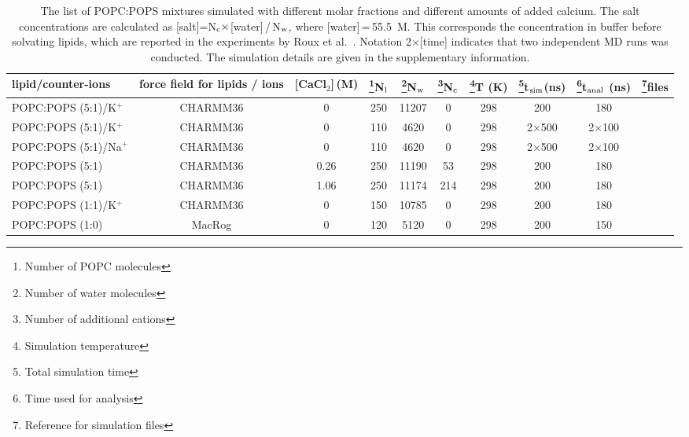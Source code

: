 \documentclass[aps,prl,superscriptaddress,twocolumn]{revtex4}
\begin{document}
\begin{table}[tb]
\centering
\caption{The list of POPC:POPS mixtures simulated with different molar fractions and different amounts of added calcium. 
  The salt concentrations are calculated as [salt]=N$_{\rm c} \times$[water]\,/\,N$_{\rm w}$, where [water]\,=\,55.5~M.
  This corresponds the concentration in buffer before solvating lipids, which are
  reported in the experiments by Roux et al.~\cite{roux90}.  Notation 2$\times$[time] indicates that two independent MD runs was conducted.
  The simulation details are given in the supplementary information. 
}\label{mixedIONsystems}
\begin{tabular}{lccccccccc}
lipid/counter-ions  & force field for lipids / ions  & {[}CaCl$_{2}${]}\,(M)  & \footnote{Number of POPC molecules}N$_{{\rm l}}$  & \footnote{Number of water molecules}N$_{{\rm w}}$  & \footnote{Number of additional cations}N$_{{\rm c}}$  & \footnote{Simulation temperature}T (K)  & \footnote{Total simulation time}t$_{{\rm sim}}$(ns)  & \footnote{Time used for analysis}t$_{{\rm anal}}$ (ns)  & \footnote{Reference for simulation files}files\tabularnewline
\hline 
POPC:POPS (5:1)/K$^{+}$  & CHARMM36 \cite{klauda10,venable13}  & 0  & 250  & 11207  & 0  & 298  & 200  & 180  & \cite{POPC5POPS1noCaClCHARMM} \tabularnewline
POPC:POPS (5:1)/K$^{+}$  & CHARMM36 \cite{klauda10,venable13}  & 0  & 110  & 4620  & 0  & 298  & 2$\times$500  & 2$\times$100  & \cite{charmm36pops+83popcT298Kpiggot} \tabularnewline
POPC:POPS (5:1)/Na$^{+}$  & CHARMM36 \cite{klauda10,venable13}  & 0  & 110 & 4620  & 0  & 298  & 2$\times$500  & 2$\times$100  & \cite{charmm36pops+83popcT298KpiggotSODIUM} \tabularnewline
POPC:POPS (5:1)  & CHARMM36 \cite{klauda10,venable13,kim16}  & 0.26  & 250 & 11190  & 53  & 298  & 200  & 180  & \cite{POPC5POPS1withCaClCHARMM} \tabularnewline
POPC:POPS (5:1)  & CHARMM36 \cite{klauda10,venable13,kim16}  & 1.06  & 250 & 11174  & 214  & 298  & 200  & 180  & \cite{POPC5POPS1with1MCaClCHARMM} \tabularnewline
POPC:POPS (1:1)/K$^{+}$  & CHARMM36 \cite{klauda10,venable13}  & 0  & 150  & 10785  & 0  & 298  & 200  & 180  & \cite{POPC1POPS1noCaClCHARMM} \tabularnewline
\hline 
POPC:POPS (1:0)  & MacRog \cite{maciejewski14}  & 0  & 120 & 5120  & 0  & 298  & 200  & 150  & \cite{macrogPOPC298K} \tabularnewline

\end{tabular}
\end{table}
\end{document}
